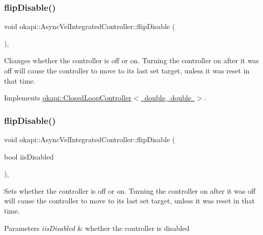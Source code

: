 \subsubsection{\texorpdfstring{flipDisable()}{flipDisable()}\hspace{0.1cm}{\footnotesize\ttfamily [1/2]}}
{\footnotesize\ttfamily void okapi\+::\+Async\+Vel\+Integrated\+Controller\+::flip\+Disable (\begin{DoxyParamCaption}{ }\end{DoxyParamCaption})\hspace{0.3cm}{\ttfamily [override]}, {\ttfamily [virtual]}}

Changes whether the controller is off or on. Turning the controller on after it was off will cause the controller to move to its last set target, unless it was reset in that time. 

Implements \mbox{\hyperlink{classokapi_1_1ClosedLoopController_a9de69b60885df41cd2164fe1a23f34d3}{okapi\+::\+Closed\+Loop\+Controller$<$ double, double $>$}}.

\mbox{\label{classokapi_1_1AsyncVelIntegratedController_a1e906e904500fe920ea4cad6a922b523}} 
\subsubsection{\texorpdfstring{flipDisable()}{flipDisable()}\hspace{0.1cm}{\footnotesize\ttfamily [2/2]}}
{\footnotesize\ttfamily void okapi\+::\+Async\+Vel\+Integrated\+Controller\+::flip\+Disable (\begin{DoxyParamCaption}\item[{bool}]{iis\+Disabled }\end{DoxyParamCaption})\hspace{0.3cm}{\ttfamily [override]}, {\ttfamily [virtual]}}

Sets whether the controller is off or on. Turning the controller on after it was off will cause the controller to move to its last set target, unless it was reset in that time.


\begin{DoxyParams}{Parameters}
{\em iis\+Disabled} & whether the controller is disabled \\
\hline
\end{DoxyParams}


